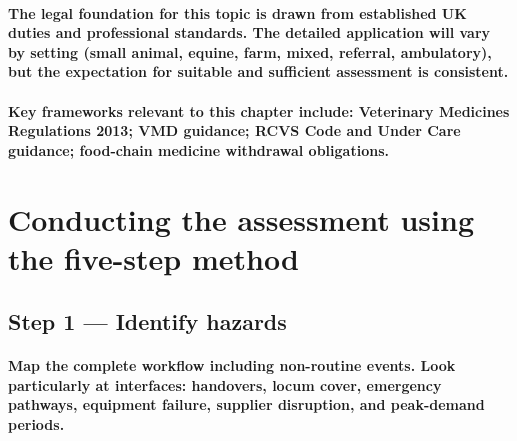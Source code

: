\paragraph{The legal foundation for this topic is drawn from established UK duties and professional standards. The detailed application will vary by setting (small animal, equine, farm, mixed, referral, ambulatory), but the expectation for suitable and sufficient assessment is consistent.}

\paragraph{Key frameworks relevant to this chapter include: Veterinary Medicines Regulations 2013; VMD guidance; RCVS Code and Under Care guidance; food-chain medicine withdrawal obligations.}

\begin{itemize}
\end{itemize}

\section{Conducting the assessment using the five-step method}

\subsection{Step 1 — Identify hazards}
\paragraph{Map the complete workflow including non-routine events. Look particularly at interfaces: handovers, locum cover, emergency pathways, equipment failure, supplier disruption, and peak-demand periods.}

